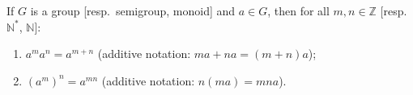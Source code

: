 \begin{theorem}
If $G$ is a group [resp.\ semigroup, monoid] and $a \in G$, then for all $m, n \in \mathbb{Z}$ [resp.\ $\mathbb{N}^*$, $\mathbb{N}$]:
\begin{enumerate}
    \item[(i)] $a^m a^n = a^{m+n}$ \quad (additive notation: $ma + na = (m + n)a$);
    \item[(ii)] $(a^m)^n = a^{mn}$ \quad (additive notation: $n(ma) = mna$).
\end{enumerate}
\end{theorem}
